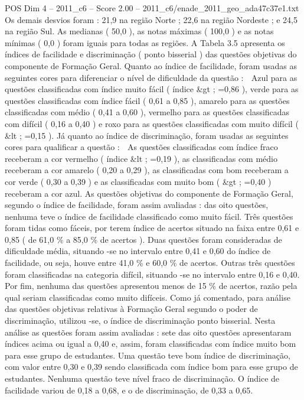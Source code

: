 \begin{textsample}{POS Dim 4 – 2011\_c6 – Score 2.00 – 2011\_c6/enade\_2011\_geo\_ada47c37e1.txt}
Os demais desvios foram : 21,9 na região Norte ; 22,6 na região Nordeste ; e 24,5 na região Sul.
As medianas ( 50,0 ), as notas máximas ( 100,0 ) e as notas mínimas ( 0,0 ) foram iguais para todas as regiões.
A Tabela 3.5 apresenta os índices de facilidade e discriminação ( ponto bisserial ) das questões objetivas do componente de Formação Geral.
Quanto ao índice de facilidade, foram usadas as seguintes cores para diferenciar o nível de dificuldade da questão :  Azul para as questões classificadas com índice muito fácil ( índice \&gt ; =0,86 ), verde para as questões classificadas com índice fácil ( 0,61 a 0,85 ), amarelo para as questões classificadas com médio ( 0,41 a 0,60 ), vermelho para as questões classificadas com difícil ( 0,16 a 0,40 ) e roxo para as questões classificadas com muito difícil ( \&lt ; =0,15 ).
Já quanto ao índice de discriminação, foram usadas as seguintes cores para qualificar a questão :  As questões classificadas com índice fraco receberam a cor vermelho ( índice \&lt ; =0,19 ), as classificadas com médio receberam a cor amarelo ( 0,20 a 0,29 ), as classificadas com bom receberam a cor verde ( 0,30 a 0,39 ) e as classificadas com muito bom ( \&gt ; =0,40 ) receberam a cor azul.
As questões objetivas do componente de Formação Geral, segundo o índice de facilidade, foram assim avaliadas : das oito questões, nenhuma teve o índice de facilidade classificado como muito fácil.
Três questões foram tidas como fáceis, por terem índice de acertos situado na faixa entre 0,61 e 0,85 ( de 61,0 \% a 85,0 \% de acertos ).
Duas questões foram consideradas de dificuldade média, situando -se no intervalo entre 0,41 e 0,60 do índice de facilidade, ou seja, houve entre 41,0 \% e 60,0 \% de acertos.
Outras três questões foram classificadas na categoria difícil, situando -se no intervalo entre 0,16 e 0,40.
Por fim, nenhuma das questões apresentou menos de 15 \% de acertos, razão pela qual seriam classificadas como muito difíceis.
Como já comentado, para análise das questões objetivas relativas à Formação Geral segundo o poder de discriminação, utilizou -se, o índice de discriminação ponto bisserial.
Nesta análise as questões foram assim avaliadas : sete das oito questões apresentaram índices acima ou igual a 0,40 e, assim, foram classificadas com índice muito bom para esse grupo de estudantes.
Uma questão teve bom índice de discriminação, com valor entre 0,30 e 0,39 sendo classificada com índice bom para esse grupo de estudantes.
Nenhuma questão teve nível fraco de discriminação.
O índice de facilidade variou de 0,18 a 0,68, e o de discriminação, de 0,33 a 0,65.

\end{textsample}
